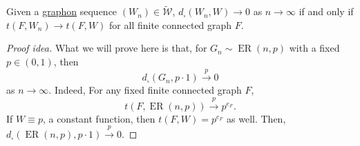 \begin{theorem}
	Given a \hyperref[def:graphon]{graphon} sequence \((W_n) \in \widetilde{\mathcal{W}} \), \(d_{\square}(W_n, W) \to 0\) as \(n \to \infty \) if and only if \(t(F, W_n) \to t(F, W)\) for all finite connected graph \(F\).
\end{theorem}
\begin{proof}[Proof idea]
	What we will prove here is that, for \(G_n \sim \operatorname{ER}(n, p) \) with a fixed \(p \in (0, 1)\), then
	\[
		d_{\square} (G_n, p \cdot 1)
		\overset{p}{\to} 0
	\]
	as \(n \to \infty \). Indeed, For any fixed finite connected graph \(F\),
	\[
		t(F, \operatorname{ER}(n, p) )
		\overset{p}{\to} p^{e_F}.
	\]
	If \(W \equiv p\), a constant function, then \(t(F, W) = p^{e_F}\) as well. Then, \(d_{\square}(\operatorname{ER}(n, p) , p \cdot 1) \overset{p}{\to} 0\).
\end{proof}